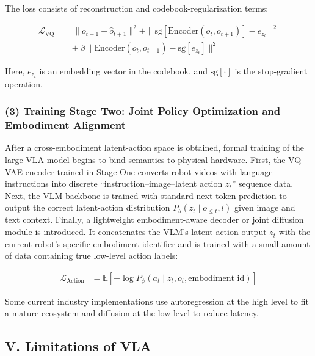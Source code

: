 The loss consists of reconstruction and codebook-regularization terms:

\[
\begin{aligned}
\mathcal{L}_{\mathrm{VQ}}
&= \|o_{t+1}-\hat{o}_{t+1}\|^2
+\|\mathrm{sg}[\mathrm{Encoder}(o_t,o_{t+1})]-e_{z_t}\|^2
\\
&\quad+
\beta\|\mathrm{Encoder}(o_t,o_{t+1})-\mathrm{sg}[e_{z_t}]\|^2
\end{aligned}
\]

Here, \(e_{z_t}\) is an embedding vector in the codebook, and \(\mathrm{sg}[\cdot]\) is the stop-gradient operation.

\hypertarget{training-stage-two-joint-policy-optimization-and-embodiment-alignment}{%
\subsubsection{(3) Training Stage Two: Joint Policy Optimization and Embodiment Alignment}\label{training-stage-two-joint-policy-optimization-and-embodiment-alignment}}

After a cross-embodiment latent-action space is obtained, formal training of the large VLA model begins to bind semantics to physical hardware. First, the VQ-VAE encoder trained in Stage One converts robot videos with language instructions into discrete ``instruction--image--latent action \(z_t\)'' sequence data. Next, the VLM backbone is trained with standard next-token prediction to output the correct latent-action distribution \(P_\theta(z_t\mid o_{\le t},l)\) given image and text context. Finally, a lightweight embodiment-aware decoder or joint diffusion module is introduced. It concatenates the VLM's latent-action output \(z_t\) with the current robot's specific embodiment identifier and is trained with a small amount of data containing true low-level action labels:

\[
\begin{aligned}
\mathcal{L}_{\mathrm{Action}}
&=
\mathbb{E}\left[
-\log P_\phi(a_t\mid z_t,o_t,\mathrm{embodiment\_id})
\right]
\end{aligned}
\]

Some current industry implementations use autoregression at the high level to fit a mature ecosystem and diffusion at the low level to reduce latency.

\hypertarget{v.-limitations-of-vla}{%
\subsection{V. Limitations of VLA}\label{v.-limitations-of-vla}}

